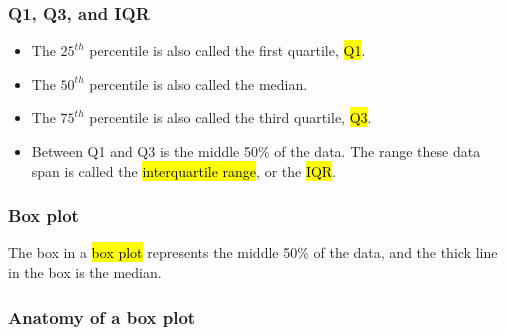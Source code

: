 \documentclass[slidestop,compress,mathserif]{beamer}
\begin{document}

\begin{frame}[fragile]
\frametitle{Q1, Q3, and IQR}

\begin{itemize}

\item The $25^{th}$ percentile is also called the first quartile, \hl{Q1}.

\item The $50^{th}$ percentile is also called the median.

\item The $75^{th}$ percentile is also called the third quartile, \hl{Q3}.

\item Between Q1 and Q3 is the middle 50\% of the data. The range these data span is called the \hl{interquartile range}, or the \hl{IQR}.
\formula{\[ IQR = Q3 - Q1 \]}
\end{itemize}

\end{frame}


\begin{frame}
\frametitle{Box plot}

The box in a \hl{box plot} represents the middle 50\% of the data, and the thick line in the box is the median.

\begin{center}
\end{center}

\end{frame}


\begin{frame}
\frametitle{Anatomy of a box plot}

\begin{center}
\end{center}

\end{frame}

\end{document}
